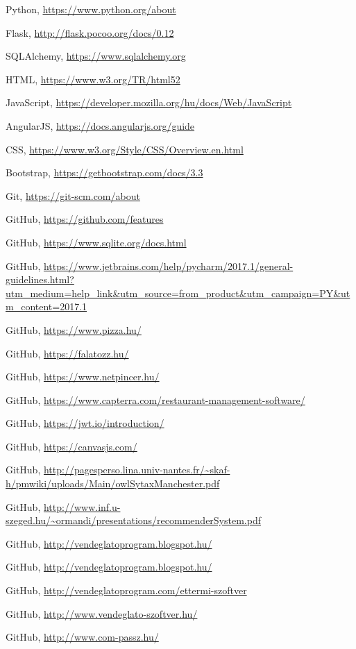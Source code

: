 \begin{thebibliography}{x}

Python, \url{https://www.python.org/about}

Flask, \url{http://flask.pocoo.org/docs/0.12}

SQLAlchemy, \url{https://www.sqlalchemy.org}

HTML, \url{https://www.w3.org/TR/html52}

JavaScript, \url{https://developer.mozilla.org/hu/docs/Web/JavaScript}

AngularJS, \url{https://docs.angularjs.org/guide}

CSS, \url{https://www.w3.org/Style/CSS/Overview.en.html}

Bootstrap, \url{https://getbootstrap.com/docs/3.3}

Git, \url{https://git-scm.com/about}

GitHub, \url{https://github.com/features}

GitHub, \url{https://www.sqlite.org/docs.html}

GitHub, \url{https://www.jetbrains.com/help/pycharm/2017.1/general-guidelines.html?utm_medium=help_link&utm_source=from_product&utm_campaign=PY&utm_content=2017.1}


GitHub, \url{https://www.pizza.hu/}

GitHub, \url{https://falatozz.hu/}

GitHub, \url{https://www.netpincer.hu/}

GitHub, \url{https://www.capterra.com/restaurant-management-software/}

GitHub, \url{https://jwt.io/introduction/}

GitHub, \url{https://canvasjs.com/}

GitHub, \url{http://pagesperso.lina.univ-nantes.fr/~skaf-h/pmwiki/uploads/Main/owlSytaxManchester.pdf}

GitHub, \url{http://www.inf.u-szeged.hu/~ormandi/presentations/recommenderSystem.pdf}

GitHub, \url{http://vendeglatoprogram.blogspot.hu/}

GitHub, \url{http://vendeglatoprogram.blogspot.hu/}

GitHub, \url{http://vendeglatoprogram.com/ettermi-szoftver}

GitHub, \url{http://www.vendeglato-szoftver.hu/}

GitHub, \url{http://www.com-passz.hu/}


\end{thebibliography}
